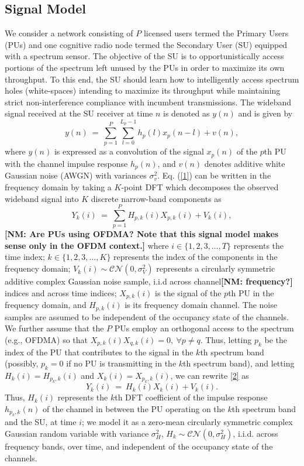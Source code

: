 \documentclass[10pt,twocolumn]{IEEEtran}
\newcommand{\nm}[1]{{\color{blue}\bf{[NM: #1]}}}
\begin{document}
\subsection{Signal Model}\label{A}
We consider a network consisting of $P$ licensed users termed the Primary Users (PUs) and one cognitive radio node termed the Secondary User (SU) equipped with a spectrum sensor. The objective of the SU is to opportunistically access portions of the spectrum left unused by the PUs in order to maximize its own throughput. To this end, the SU should learn how to intelligently access spectrum holes (white-spaces) intending to maximize its throughput while maintaining strict non-interference compliance with incumbent transmissions.
The wideband signal received at the SU receiver at time $n$ is denoted as $y(n)$ and is given by 
\begin{equation}\label{1}
    y(n)\ =\ \sum_{p=1}^{P}\sum_{l=0}^{L_{p}-1} h_{p}(l)x_{p}(n-l) + v(n),
\end{equation}
where $y(n)$ is expressed as a convolution of the signal $x_{p}(n)$ of the $p$th PU with the channel impulse response $h_{p}(n)$, and $v(n)$ denotes additive white Gaussian noise (AWGN) with variances $\sigma_v^2$. Eq. (\ref{1}) can be written in the frequency domain by taking a $K$-point DFT which decomposes the observed wideband signal into $K$ discrete narrow-band components as 
\begin{equation}\label{2}
    Y_k(i)\ =\ \sum_{p=1}^{P}H_{p,k}(i)X_{p,k}(i)+V_k(i),
\end{equation}
\nm{Are PUs using OFDMA? Note that this signal model makes sense only in the OFDM context.}
where $i \in \{1,2,3,\dots,T\}$ represents the time index; $k \in \{1,2,3,\dots,K\}$ represents the index of the components in the frequency domain; $V_k(i) \sim \mathcal{CN}(0,\sigma_V^2)$ represents a circularly symmetric additive complex Gaussian noise sample, i.i.d across channel\nm{frequency?} indices and across time indices; $X_{p,k}(i)$ is the signal of the $p$th PU in the frequency domain, and $H_{p,k}(i)$ is its frequency domain channel. The noise samples are assumed to be independent of the occupancy state of the channels. We further assume that the $P$ PUs employ an orthogonal access to the spectrum (e.g., OFDMA) so that $X_{p,k}(i)X_{q,k}(i)=0,\ \forall p\neq q$. Thus, letting $p_k$ be the index of the PU that contributes to the signal in the $k$th spectrum band (possibly, $p_k=0$ if no PU is transmitting in the $k$th spectrum band), and letting  $H_{k}(i)=H_{p_k,k}(i)$ and $X_{k}(i)=X_{p_k,k}(i)$, we can rewrite \eqref{2} as 
\begin{equation}\label{3}
    Y_k(i)\ =\ H_{k}(i)X_{k}(i) + V_k(i).
\end{equation}
Thus, $H_k(i)$ represents the $k$th DFT coefficient of the impulse response $h_{p_k,k}(n)$ of the channel in between the PU operating on the $k$th spectrum band and the SU, at time $i$; we model it as a zero-mean circularly symmetric complex Gaussian random variable with variance $\sigma_H^2$, $H_k \sim \mathcal{CN}(0,\sigma_H^2)$, i.i.d. across frequency bands, over time, and independent of the occupancy state of the channels.
\end{document}
